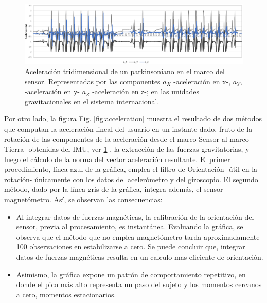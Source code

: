\begin{figure}[h!]
\hspace*{-2.9cm}%
\includegraphics[clip,width=1.4 \columnwidth]{TESIS/imagenes/chap06/acceleration-components.PNG}
\caption{Aceleración tridimensional de un parkinsoniano en el marco del sensor. Representadas por las componentes $a_X$ -aceleración en x-, $a_Y$, -aceleración en y- $a_Z$ -aceleración en z-; en las unidades gravitacionales en el sistema internacional.}
\label{fig:acceleration-components}
\end{figure}

\newpage

Por otro lado, la figura Fig. \ref{fig:acceleration} muestra el resultado de dos métodos que computan la aceleración lineal del usuario en un instante dado, fruto de la rotación de las componentes de la aceleración desde el marco Sensor al marco Tierra -obtenidas del IMU, ver \ref{fig:acceleration-components}-, la extracción de las fuerzas gravitatorias, y luego el cálculo de la norma del vector aceleración resultante. El primer procedimiento, línea azul de la gráfica, emplea el filtro de Orientación -útil en la rotación- únicamente con los datos del acelerómetro y del giroscopio. El segundo método, dado por la línea gris de la gráfica, integra además, el sensor magnetómetro. Así, se observan las consecuencias:

\begin{itemize}
    \item Al integrar datos de fuerzas magnéticas, la calibración de la orientación del sensor, previa al procesamiento, es instantánea. Evaluando la gráfica, se observa que el método que no emplea magnetómetro tarda aproximadamente 100 observaciones en estabilizarse a cero. Se puede concluir que, integrar datos de fuerzas magnéticas resulta en un calculo mas eficiente de orientación.
    \item Asimismo, la gráfica expone un patrón de comportamiento repetitivo, en donde el pico más alto representa un paso del sujeto y los momentos cercanos a cero, momentos estacionarios.
\end{itemize}

